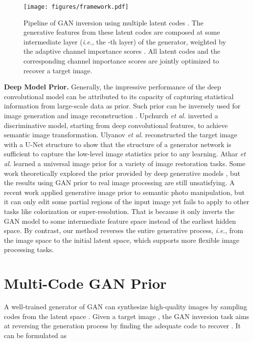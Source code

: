 \documentclass[10pt,twocolumn,letterpaper]{article}
\begin{document}
\begin{figure*}[t]
  \centering
  \texttt{[image: figures/framework.pdf]}
  \vspace{-10pt}
  \captionsetup{font=small}
  \caption{
    Pipeline of GAN inversion using multiple latent codes .
The generative features from these latent codes are composed at some intermediate layer (\emph{i.e.}, the -th layer) of the generator, weighted by the adaptive channel importance scores .
All latent codes and the corresponding channel importance scores are jointly optimized to recover a target image.
  }
  \label{fig:framework}
 \vspace{-10pt}
\end{figure*}


\vspace{2pt}\noindent\textbf{Deep Model Prior.}
Generally, the impressive performance of the deep convolutional model can be attributed to its capacity of capturing statistical information from large-scale data as prior.
Such prior can be inversely used for image generation and image reconstruction \cite{upchurch2017deep,ulyanov2018deep,athar2019latent}.
Upchurch \emph{et al.} \cite{upchurch2017deep} inverted a discriminative model, starting from deep convolutional features, to achieve semantic image transformation.
Ulyanov \emph{et al.} \cite{ulyanov2018deep} reconstructed the target image with a U-Net structure to show that the structure of a generator network is sufficient to capture the low-level image statistics prior to any learning.
Athar \emph{et al.} \cite{athar2019latent} learned a universal image prior for a variety of image restoration tasks.
Some work theoretically explored the prior provided by deep generative models \cite{invertibility,hand2019global}, but the results using GAN prior to real image processing are still unsatisfying.
A recent work \cite{bau2019semantic} applied generative image prior to semantic photo manipulation, but it can only edit some partial regions of the input image yet fails to apply to other tasks like colorization or super-resolution.
That is because it only inverts the GAN model to some intermediate feature space instead of the earliest hidden space.
By contrast, our method reverses the entire generative process, \emph{i.e.}, from the image space to the initial latent space, which supports more flexible image processing tasks.


\section{Multi-Code GAN Prior}\label{sec:method}
A well-trained generator  of GAN can synthesize high-quality images by sampling codes from the latent space .
Given a target image , the GAN inversion task aims at reversing the generation process by finding the adequate code to recover .
It can be formulated as
\end{document}
